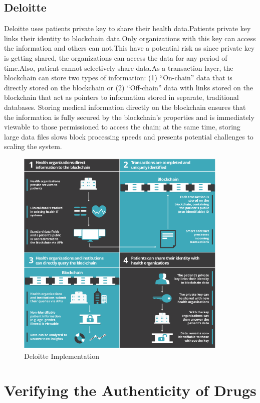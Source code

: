 \documentclass[12pt]{report}
\begin{document}
\subsection{Deloitte \cite{1}}
Deloitte uses patients private key to share their health data.Patients private key links their identity to blockchain data.Only organizations with this key can access the information and others can not.This have a potential risk as since private key is getting shared, the organizations can access the data for any period of time.Also, patient cannot selectively share data.As a transaction layer, the blockchain can
store two types of information: (1)
“On-chain” data that is directly stored on the
blockchain or (2) “Off-chain” data with links
stored on the blockchain that act as pointers
to information stored in separate, traditional
databases. Storing medical information
directly on the blockchain ensures that the
information is fully secured by the
blockchain’s properties and is immediately
viewable to those permissioned to access
the chain; at the same time, storing large
data files slows block processing speeds and
presents potential challenges to scaling the
system.
\begin{figure}[H]
\centering
\includegraphics[width=0.9\textwidth]{diloitte.png}
\caption{Deloitte Implementation}
\label{diloitte}
\end{figure}

\section{Verifying the Authenticity of Drugs}
\end{document}
